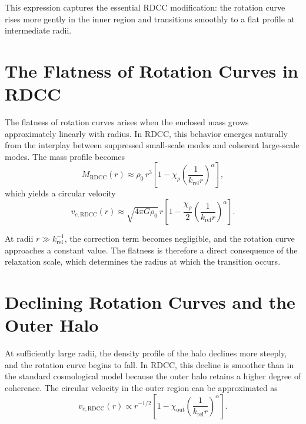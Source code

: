 \documentclass[11pt,a4paper]{article}
\begin{document}
This expression captures the essential RDCC modification: the rotation curve rises 
more gently in the inner region and transitions smoothly to a flat profile at 
intermediate radii.
\section{The Flatness of Rotation Curves in RDCC}

The flatness of rotation curves arises when the enclosed mass grows approximately 
linearly with radius. In RDCC, this behavior emerges naturally from the interplay 
between suppressed small-scale modes and coherent large-scale modes. The mass 
profile becomes
\begin{equation}
    M_{\mathrm{RDCC}}(r)
    \approx \rho_{0}\, r^{3}
    \left[
        1 - \chi_{\rho}
        \left(\frac{1}{k_{\mathrm{rel}} r}\right)^{\alpha}
    \right],
\end{equation}
which yields a circular velocity
\begin{equation}
    v_{c,\mathrm{RDCC}}(r)
    \approx \sqrt{4\pi G \rho_{0}}\, r
    \left[
        1 - \frac{\chi_{\rho}}{2}
        \left(\frac{1}{k_{\mathrm{rel}} r}\right)^{\alpha}
    \right].
\end{equation}

At radii $r \gg k_{\mathrm{rel}}^{-1}$, the correction term becomes negligible, and 
the rotation curve approaches a constant value. The flatness is therefore a direct 
consequence of the relaxation scale, which determines the radius at which the 
transition occurs.
\section{Declining Rotation Curves and the Outer Halo}

At sufficiently large radii, the density profile of the halo declines more steeply, 
and the rotation curve begins to fall. In RDCC, this decline is smoother than in 
the standard cosmological model because the outer halo retains a higher degree of 
coherence. The circular velocity in the outer region can be approximated as
\begin{equation}
    v_{c,\mathrm{RDCC}}(r)
    \propto r^{-1/2}
    \left[
        1 - \chi_{\mathrm{out}}
        \left(\frac{1}{k_{\mathrm{rel}} r}\right)^{\alpha}
    \right].
\end{equation}
\end{document}
